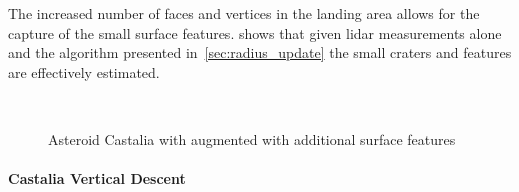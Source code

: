 The increased number of faces and vertices in the landing area allows for the capture of the small surface features.
 shows that given \gls{lidar} measurements alone and the algorithm presented in~\cref{sec:radius_update} the small craters and features are effectively estimated.
\begin{figure}[htbp]
    \centering
    ~
    \caption{Asteroid Castalia with augmented with additional surface features~\label{fig:castalia_refinement}}
\end{figure}

\paragraph{Castalia Vertical Descent}

